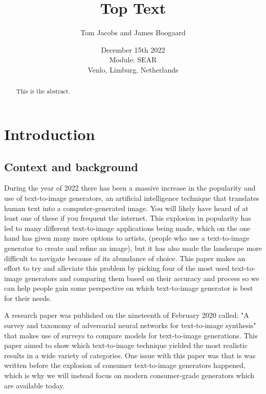 \documentclass[]{report}
\title{Top Text}
\author{Tom Jacobs and James Boogaard}
\date{December 15th 2022 \\Module: SEAR \\Venlo, Limburg, Netherlands}
\begin{document}
	
	\maketitle
	
	\begin{abstract}
		This is the abstract.
		
		
	\end{abstract}
	
	\tableofcontents
	\setcounter{page}{3}
	\listoffigures %
	\pagebreak
	
	
	\section{Introduction}
	
	\subsection{Context and background}
During the year of 2022 there has been a massive increase in the popularity and use of text-to-image generators, an artificial intelligence technique that translates human text into a computer-generated image. You will likely have heard of at least one of these if you frequent the internet. This explosion in popularity has led to many different text-to-image applications being made, which on the one hand has given many more options to artists, (people who use a text-to-image generator to create and refine an image), but it has also made the landscape more difficult to navigate because of its abundance of choice. This paper makes an effort to try and alleviate this problem by picking four of the most used text-to-image generators and comparing them based on their accuracy and process so we can help people gain some perspective on which text-to-image generator is best for their needs.

A research paper was published on the nineteenth of February 2020 called: "A survey and taxonomy of adversarial neural networks for text-to-image synthesis" that makes use of surveys to compare models for text-to-image generations. This paper aimed to show which text-to-image technique yielded the most realistic results in a wide variety of categories. One issue with this paper was that is was written before the explosion of consumer text-to-image generators happened, which is why we will instead focus on modern consumer-grade generators which are available today.
\end{document}
